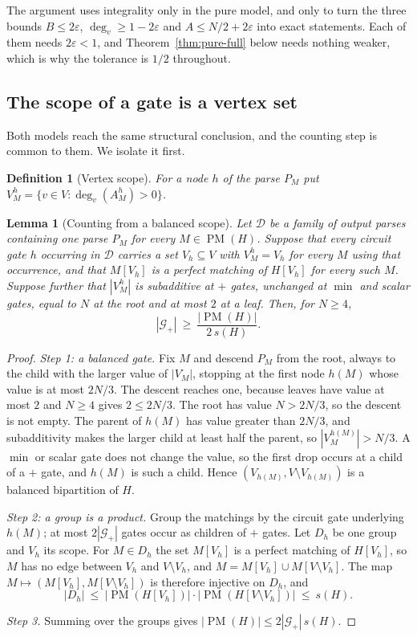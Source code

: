 \documentclass[11pt]{article}
\newtheorem{lemma}[theorem]{Lemma}
\newtheorem{definition}[theorem]{Definition}
\newcommand{\PM}{\operatorname{PM}}
\begin{document}
The argument uses integrality only in the pure model, and only to turn the three
bounds $B\le2\varepsilon$, $\deg_v\ge1-2\varepsilon$ and $A\le N/2+2\varepsilon$
into exact statements.  Each of them needs $2\varepsilon<1$, and
Theorem~\ref{thm:pure-full} below needs nothing weaker, which is why the
tolerance is $1/2$ throughout.

\subsection{The scope of a gate is a vertex set}

Both models reach the same structural conclusion, and the counting step is
common to them.  We isolate it first.

\begin{definition}[Vertex scope]
\label{def:vertex-scope}
For a node $h$ of the parse $P_M$ put
$V^h_M=\{v\in V:\deg_v(A^h_M)>0\}$.
\end{definition}

\begin{lemma}[Counting from a balanced scope]
\label{lem:count}
Let $\mathcal D$ be a family of output parses containing one parse $P_M$ for
every $M\in\PM(H)$.  Suppose that every circuit gate $h$ occurring in $\mathcal
D$ carries a set $V_h\subseteq V$ with $V^h_M=V_h$ for every $M$ using that
occurrence, and that $M[V_h]$ is a perfect matching of $H[V_h]$ for every such
$M$.  Suppose further that $|V^h_M|$ is subadditive at $+$ gates, unchanged at
$\min$ and scalar gates, equal to $N$ at the root and at most $2$ at a leaf.
Then, for $N\ge4$,
\[
  |\mathcal G_+|\ \ge\ \frac{|\PM(H)|}{2\,s(H)} .
\]
\end{lemma}

\begin{proof}
\emph{Step 1: a balanced gate.}
Fix $M$ and descend $P_M$ from the root, always to the child with the larger
value of $|V^{\cdot}_M|$, stopping at the first node $h(M)$ whose value is at
most $2N/3$.  The descent reaches one, because leaves have value at most $2$ and
$N\ge4$ gives $2\le2N/3$.  The root has value $N>2N/3$, so the descent is not
empty.
The parent of $h(M)$ has value greater than $2N/3$, and subadditivity makes the
larger child at least half the parent, so $|V^{h(M)}_M|>N/3$.  A $\min$ or
scalar gate does not change the value, so the first drop occurs at a child of a
$+$ gate, and $h(M)$ is such a child.  Hence $(V_{h(M)},V\setminus V_{h(M)})$ is
a balanced bipartition of $H$.

\emph{Step 2: a group is a product.}
Group the matchings by the circuit gate underlying $h(M)$; at most
$2|\mathcal G_+|$ gates occur as children of $+$ gates.  Let $D_h$ be one group
and $V_h$ its scope.  For $M\in D_h$ the set $M[V_h]$ is a perfect matching of
$H[V_h]$, so $M$ has no edge between $V_h$ and $V\setminus V_h$, and
$M=M[V_h]\cup M[V\setminus V_h]$.  The map
$M\mapsto(M[V_h],M[V\setminus V_h])$ is therefore injective on $D_h$, and
\[
  |D_h|\ \le\ |\PM(H[V_h])|\cdot|\PM(H[V\setminus V_h])|\ \le\ s(H).
\]

\emph{Step 3.}  Summing over the groups gives
$|\PM(H)|\le2|\mathcal G_+|\,s(H)$.
\end{proof}
\end{document}
